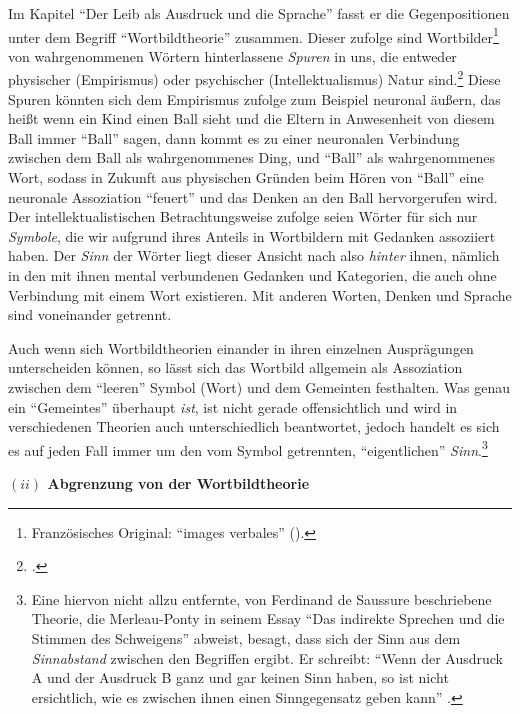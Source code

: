 \documentclass[a4paper, 12pt]{article}
\begin{document}
\begin{onehalfspace}
Im Kapitel "`Der Leib als Ausdruck und die Sprache"' fasst er die Gegenpositionen unter dem Begriff "`Wortbildtheorie"' zusammen. Dieser zufolge sind Wortbilder\footnote{Französisches Original: "`images verbales"' (\Cite[siehe][S. 203]{franzoesisch_phen}).} von wahrgenommenen Wörtern hinterlassene \emph{Spuren} in uns, die entweder physischer (Empirismus) oder psychischer (Intellektualismus) Natur sind.\footnote{\Cite[Vgl.][S. 208]{merleau1966phanomenologie}.} Diese Spuren könnten sich dem Empirismus zufolge zum Beispiel neuronal äußern, das heißt wenn ein Kind einen Ball sieht und die Eltern in Anwesenheit von diesem Ball immer "`Ball"' sagen, dann kommt es zu einer neuronalen Verbindung zwischen dem Ball als wahrgenommenes Ding, und "`Ball"' als wahrgenommenes Wort, sodass in Zukunft aus physischen Gründen beim Hören von "`Ball"' eine neuronale Assoziation "`feuert"' und das Denken an den Ball hervorgerufen wird. Der intellektualistischen Betrachtungsweise zufolge seien Wörter für sich nur \emph{Symbole}, die wir aufgrund ihres Anteils in Wortbildern mit Gedanken assoziiert haben. Der \emph{Sinn} der Wörter liegt dieser Ansicht nach also \emph{hinter} ihnen, nämlich in den mit ihnen mental verbundenen Gedanken und Kategorien, die auch ohne Verbindung mit einem Wort existieren. Mit anderen Worten, Denken und Sprache sind voneinander getrennt.

Auch wenn sich Wortbildtheorien einander in ihren einzelnen Ausprägungen unterscheiden können, so lässt sich das Wortbild allgemein als Assoziation zwischen dem "`leeren"' Symbol (Wort) und dem Gemeinten festhalten. Was genau ein "`Gemeintes"' überhaupt \emph{ist}, ist nicht gerade offensichtlich und wird in verschiedenen Theorien auch unterschiedlich beantwortet, jedoch handelt es sich es auf jeden Fall immer um den vom Symbol getrennten, "`eigentlichen"' \emph{Sinn}.\footnote{Eine hiervon nicht allzu entfernte, von Ferdinand de Saussure beschriebene Theorie, die Merleau-Ponty in seinem Essay "`Das indirekte Sprechen und die Stimmen des Schweigens"' abweist, besagt, dass sich der Sinn aus dem \emph{Sinnabstand} zwischen den Begriffen ergibt. Er schreibt: "`Wenn der Ausdruck A und der Ausdruck B ganz und gar keinen Sinn haben, so ist nicht ersichtlich, wie es zwischen ihnen einen Sinngegensatz geben kann"' .} 

\vspace{5mm}

\noindent\textbf{$(ii)$ Abgrenzung von der Wortbildtheorie}


\end{onehalfspace}
\end{document}

